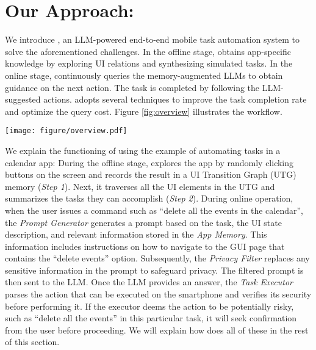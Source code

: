 \section{Our Approach: \name}
\label{sec:approach}

We introduce \name, an LLM-powered end-to-end mobile task automation system to solve the aforementioned challenges. In the offline stage, \name obtains app-specific knowledge by exploring UI relations and synthesizing simulated tasks. In the online stage, \name continuously queries the memory-augmented LLMs to obtain guidance on the next action. The task is completed by following the LLM-suggested actions. \name adopts several techniques to improve the task completion rate and optimize the query cost. Figure \ref{fig:overview} illustrates the workflow. 

\begin{figure*}
    \centering
    \texttt{[image: figure/overview.pdf]}
    \vspace{-0.3cm}
    \caption{The workflow of \name.}
    \label{fig:overview}
    \vspace{-0.2cm}
\end{figure*}

We explain the functioning of \name using the example of automating tasks in a calendar app:
During the offline stage, \name explores the app by randomly clicking buttons on the screen and records the result in a UI Transition Graph (UTG) memory (\textit{Step 1}). Next, it traverses all the UI elements in the UTG and summarizes the tasks they can accomplish (\textit{Step 2}).
During online operation, when the user issues a command such as ``delete all the events in the calendar'', the \textit{Prompt Generator} generates a prompt based on the task, the UI state description, and relevant information stored in the \textit{App Memory}. This information includes instructions on how to navigate to the GUI page that contains the ``delete events'' option.
Subsequently, the \textit{Privacy Filter} replaces any sensitive information in the prompt to safeguard privacy. The filtered prompt is then sent to the LLM.
Once the LLM provides an answer, the \textit{Task Executor} parses the action that can be executed on the smartphone and verifies its security before performing it. If the executor deems the action to be potentially risky, such as ``delete all the events'' in this particular task, it will seek confirmation from the user before proceeding. We will explain how \name does all of these in the rest of this section.

